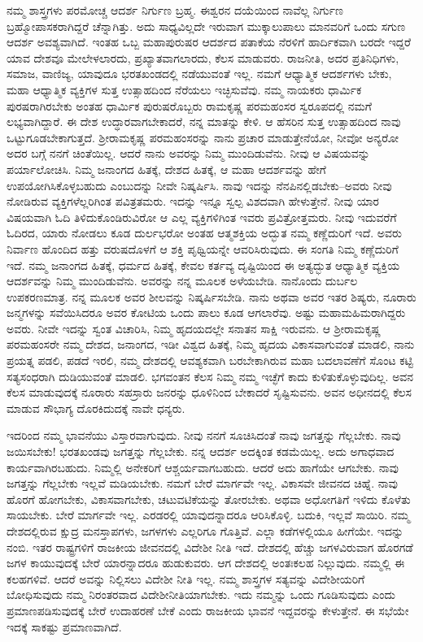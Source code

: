 ನಮ್ಮ ಶಾಸ್ತ್ರಗಳು ಪರಮೋಚ್ಚ ಆದರ್ಶ ನಿರ್ಗುಣ ಬ್ರಹ್ಮ. ಈಶ್ವರನ ದಯೆಯಿಂದ ನಾವೆಲ್ಲ ನಿರ್ಗುಣ ಬ್ರಹ್ಮೋಪಾಸಕರಾಗಿದ್ದರೆ ಚೆನ್ನಾಗಿತ್ತು. ಅದು ಸಾಧ್ಯವಿಲ್ಲದೇ ಇರುವಾಗ ಮುಕ್ಕಾಲುಪಾಲು ಮಾನವರಿಗೆ ಒಂದು ಸಗುಣ ಆದರ್ಶ ಅವಶ್ಯವಾಗಿದೆ. ಇಂತಹ ಒಬ್ಬ ಮಹಾಪುರುಷರ ಆದರ್ಶದ ಪತಾಕೆಯ ನೆರಳಿಗೆ ಹಾರ್ದಿಕವಾಗಿ ಬರದೇ ಇದ್ದರೆ ಯಾವ ದೇಶವೂ ಮೇಲೇಳಲಾರದು, ಪ್ರಖ್ಯಾತವಾಗಲಾರದು, ಕೆಲಸ ಮಾಡುವರು. ರಾಜನೀತಿ, ಅದರ ಪ್ರತಿನಿಧಿಗಳು, ಸಮಾಜ, ವಾಣಿಜ್ಯ, ಯಾವುದೂ ಭರತಖಂಡದಲ್ಲಿ ನಡೆಯುವಂತೆ ಇಲ್ಲ. ನಮಗೆ ಆಧ್ಯಾತ್ಮಿಕ ಆದರ್ಶಗಳು ಬೇಕು, ಮಹಾ ಆಧ್ಯಾತ್ಮಿಕ ವ್ಯಕ್ತಿಗಳ ಸುತ್ತ ಉತ್ಸಾಹದಿಂದ ನೆರೆಯಲು ಇಚ್ಛಿಸುವೆವು. ನಮ್ಮ ನಾಯಕರು ಧಾರ್ಮಿಕ ಪುರಷರಾಗಿರಬೇಕು ಅಂತಹ ಧಾರ್ಮಿಕ ಪುರುಷರೊಬ್ಬರು ರಾಮಕೃಷ್ಣ ಪರಮಹಂಸರ ಸ್ವರೂಪದಲ್ಲಿ ನಮಗೆ ಲಭ್ಯವಾಗಿದ್ದಾರೆ. ಈ ದೇಶ ಉದ್ಧಾರವಾಗಬೇಕಾದರೆ, ನನ್ನ ಮಾತನ್ನು ಕೇಳಿ. ಆ ಹೆಸರಿನ ಸುತ್ತ ಉತ್ಸಾಹದಿಂದ ನಾವು ಒಟ್ಟುಗೂಡಬೇಕಾಗುತ್ತದೆ. ಶ‍್ರೀರಾಮಕೃಷ್ಣ ಪರಮಹಂಸರನ್ನು ನಾನು ಪ್ರಚಾರ ಮಾಡುತ್ತೇನೆಯೋ, ನೀವೋ ಅನ್ಯರೋ ಅದರ ಬಗ್ಗೆ ನನಗೆ ಚಿಂತೆಯಿಲ್ಲ. ಆದರೆ ನಾನು ಅವರನ್ನು ನಿಮ್ಮ ಮುಂದಿಡುವೆನು. ನೀವು ಆ ವಿಷಯವನ್ನು ಪರ್ಯಾಲೋಚಿಸಿ. ನಿಮ್ಮ ಜನಾಂಗದ ಹಿತಕ್ಕೆ, ದೇಶದ ಹಿತಕ್ಕೆ, ಆ ಮಹಾ ಆದರ್ಶವನ್ನು ಹೇಗೆ ಉಪಯೋಗಿಸಿಕೊಳ್ಳಬಹುದು ಎಂಬುದನ್ನು ನೀವೇ ನಿಷ್ಕರ್ಷಿಸಿ. ನಾವು ಇದನ್ನು ನೆನಪಿನಲ್ಲಿಡಬೇಕು–ಅವರು ನೀವು ನೋಡಿರುವ ವ್ಯಕ್ತಿಗಳೆಲ್ಲರಿಗಿಂತ ಪವಿತ್ರತಮರು. ಇದನ್ನು ಇನ್ನೂ ಸ್ವಲ್ಪ ವಿಶದವಾಗಿ ಹೇಳುತ್ತೇನೆ. ನೀವು ಯಾರ ವಿಷಯವಾಗಿ ಓದಿ ತಿಳಿದುಕೊಂಡಿರುವಿರೋ ಆ ಎಲ್ಲ ವ್ಯಕ್ತಿಗಳಿಗಿಂತ ಇವರು ಪ್ರವಿತ್ರೋತ್ತಮರು. ನೀವು ಇದುವರೆಗೆ ಓದಿರದ, ಯಾರು ನೋಡಲು ಕೂಡ ದುರ್ಲಭರೋ ಅಂತಹ ಆತ್ಮಶಕ್ತಿಯ ಅದ್ಭುತ ನಮ್ಮ ಕಣ್ಣೆದುರಿಗೆ ಇದೆ. ಅವರು ನಿರ್ವಾಣ ಹೊಂದಿದ ಹತ್ತು ವರುಷದೊಳಗೆ ಆ ಶಕ್ತಿ ಪೃಥ್ವಿಯನ್ನೇ ಆವರಿಸಿರುವುದು. ಈ ಸಂಗತಿ ನಿಮ್ಮ ಕಣ್ಣೆದುರಿಗೆ ಇದೆ. ನಮ್ಮ ಜನಾಂಗದ ಹಿತಕ್ಕೆ, ಧರ್ಮದ ಹಿತಕ್ಕೆ, ಕೇವಲ ಕರ್ತವ್ಯ ದೃಷ್ಟಿಯಿಂದ ಈ ಅತ್ಯದ್ಭುತ ಆಧ್ಯಾತ್ಮಿಕ ವ್ಯಕ್ತಿಯ ಆದರ್ಶವನ್ನು ನಿಮ್ಮ ಮುಂದಿಡುವೆನು. ಅವರನ್ನು ನನ್ನ ಮೂಲಕ ಅಳೆಯಬೇಡಿ. ನಾನೊಂದು ದುರ್ಬಲ ಉಪಕರಣಮಾತ್ರ. ನನ್ನ ಮೂಲಕ ಅವರ ಶೀಲವನ್ನು ನಿಷ್ಕರ್ಷಿಸಬೇಡಿ. ನಾನು ಅಥವಾ ಅವರ ಇತರ ಶಿಷ್ಯರು, ನೂರಾರು ಜನ್ಮಗಳನ್ನು ಸವೆಯಿಸಿದರೂ ಅವರ ಕೋಟಿಯ ಒಂದು ಪಾಲು ಕೂಡ ಆಗಲಾರೆವು. ಅಷ್ಟು ಮಹಾಮಹಿಮರಾಗಿದ್ದರು ಅವರು. ನೀವೇ ಇದನ್ನು ಸ್ವಂತ ವಿಚಾರಿಸಿ, ನಿಮ್ಮ ಹೃದಯದಲ್ಲೇ ಸನಾತನ ಸಾಕ್ಷಿ ಇರುವನು. ಆ ಶ‍್ರೀರಾಮಕೃಷ್ಣ ಪರಮಹಂಸರೇ ನಮ್ಮ ದೇಶದ, ಜನಾಂಗದ, ಇಡೀ ವಿಶ್ವದ ಹಿತಕ್ಕೆ, ನಿಮ್ಮ ಹೃದಯ ವಿಕಾಸವಾಗುವಂತೆ ಮಾಡಲಿ, ನಾನು ಪ್ರಯತ್ನ ಪಡಲಿ, ಪಡದೆ ಇರಲಿ, ನಮ್ಮ ದೇಶದಲ್ಲಿ ಆವಶ್ಯಕವಾಗಿ ಬರಬೇಕಾಗಿರುವ ಮಹಾ ಬದಲಾವಣೆಗೆ ಸೊಂಟ ಕಟ್ಟಿ ಸತ್ಯಸಂಧರಾಗಿ ದುಡಿಯುವಂತೆ ಮಾಡಲಿ. ಭಗವಂತನ ಕೆಲಸ ನಿಮ್ಮ ನಮ್ಮ ಇಚ್ಛೆಗೆ ಕಾದು ಕುಳಿತುಕೊಳ್ಳುವುದಿಲ್ಲ. ಅವನ ಕೆಲಸ ಮಾಡುವುದಕ್ಕೆ ನೂರಾರು ಸಹಸ್ರಾರು ಜನರನ್ನು ಧೂಳಿನಿಂದ ಬೇಕಾದರೆ ಸೃಷ್ಟಿಸುವನು. ಅವನ ಅಧೀನದಲ್ಲಿ ಕೆಲಸ ಮಾಡುವ ಸೌಭಾಗ್ಯ ದೊರಕಿದುದಕ್ಕೆ ನಾವೇ ಧನ್ಯರು.

ಇದರಿಂದ ನಮ್ಮ ಭಾವನೆಯು ವಿಸ್ತಾರವಾಗುವುದು. ನೀವು ನನಗೆ ಸೂಚಿಸಿದಂತೆ ನಾವು ಜಗತ್ತನ್ನು ಗೆಲ್ಲಬೇಕು. ನಾವು ಜಯಿಸಬೇಕು! ಭರತಖಂಡವು ಜಗತ್ತನ್ನು ಗೆಲ್ಲಬೇಕು. ನನ್ನ ಆದರ್ಶ ಅದಕ್ಕಿಂತ ಕಡಮೆಯಿಲ್ಲ. ಅದು ಅಗಾಧವಾದ ಕಾರ್ಯವಾಗಿರಬಹುದು. ನಿಮ್ಮಲ್ಲಿ ಅನೇಕರಿಗೆ ಆಶ್ಚರ್ಯವಾಗಬಹುದು. ಆದರೆ ಅದು ಹಾಗೆಯೇ ಆಗಬೇಕು. ನಾವು ಜಗತ್ತನ್ನು ಗೆಲ್ಲಬೇಕು ಇಲ್ಲವೆ ಮಡಿಯಬೇಕು. ನಮಗೆ ಬೇರೆ ಮಾರ್ಗವೇ ಇಲ್ಲ. ವಿಕಾಸವೇ ಜೀವನದ ಚಿಹ್ನೆ. ನಾವು ಹೊರಗೆ ಹೋಗಬೇಕು, ವಿಕಾಸವಾಗಬೇಕು, ಚಟುವಟಿಕೆಯನ್ನು ತೋರಬೇಕು. ಅಥವಾ ಅಧೋಗತಿಗೆ ಇಳಿದು ಕೊಳೆತು ಸಾಯಬೇಕು. ಬೇರೆ ಮಾರ್ಗವೇ ಇಲ್ಲ. ಎರಡರಲ್ಲಿ ಯಾವುದನ್ನಾದರೂ ಆರಿಸಿಕೊಳ್ಳಿ. ಬದುಕಿ, ಇಲ್ಲವೆ ಸಾಯಿರಿ. ನಮ್ಮ ದೇಶದಲ್ಲಿರುವ ಕ್ಷುದ್ರ ಮನಸ್ತಾಪಗಳು, ಜಗಳಗಳು ಎಲ್ಲರಿಗೂ ಗೊತ್ತಿವೆ. ಎಲ್ಲಾ ಕಡೆಗಳಲ್ಲಿಯೂ ಹೀಗೆಯೇ. ಇದನ್ನು ನಂಬಿ. ಇತರ ರಾಷ್ಟ್ರಗಳಿಗೆ ರಾಜಕೀಯ ಜೀವನದಲ್ಲಿ ವಿದೇಶೀ ನೀತಿ ಇದೆ. ದೇಶದಲ್ಲಿ ಹೆಚ್ಚು ಜಗಳವಿರುವಾಗ ಹೊರಗಡೆ ಜಗಳ ಕಾಯುವುದಕ್ಕೆ ಬೇರೆ ಯಾರನ್ನಾದರೂ ಹುಡುಕುವರು. ಆಗ ದೇಶದಲ್ಲಿ ಅಂತಃಕಲಹ ನಿಲ್ಲುವುದು. ನಮ್ಮಲ್ಲಿ ಈ ಕಲಹಗಳಿವೆ. ಆದರೆ ಅವನ್ನು ನಿಲ್ಲಿಸಲು ವಿದೇಶೀ ನೀತಿ ಇಲ್ಲ. ನಮ್ಮ ಶಾಸ್ತ್ರಗಳ ಸತ್ಯವನ್ನು ವಿದೇಶೀಯರಿಗೆ ಬೋಧಿಸುವುದು ನಮ್ಮ ನಿರಂತರವಾದ ವಿದೇಶೀನೀತಿಯಾಗಬೇಕು. ಇದು ನಮ್ಮನ್ನು ಒಂದು ಗೂಡಿಸುವುದು ಎಂದು ಪ್ರಮಾಣಪಡಿಸುವುದಕ್ಕೆ ಬೇರೆ ಉದಾಹರಣೆ ಬೇಕೆ ಎಂದು ರಾಜಕೀಯ ಭಾವನೆ ಇದ್ದವರನ್ನು ಕೇಳುತ್ತೇನೆ. ಈ ಸಭೆಯೇ ಇದಕ್ಕೆ ಸಾಕಷ್ಟು ಪ್ರಮಾಣವಾಗಿದೆ.

